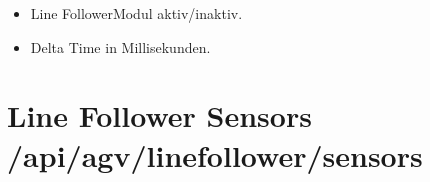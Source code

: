 \documentclass[letterpaper,10pt,english]{sphinxmanual}
\begin{document}
\sphinxAtStartPar
{}

\begin{sphinxVerbatim}[commandchars=\\\{\}]
\end{sphinxVerbatim}

\sphinxAtStartPar
{}
\begin{itemize}
\item {} 
\sphinxAtStartPar
{}  \textendash{} Line Follower\sphinxhyphen{}Modul aktiv/inaktiv.

\item {} 
\sphinxAtStartPar
{}  \textendash{} Delta Time in Millisekunden.

\end{itemize}


\section{Line Follower Sensors \textendash{} /api/agv/linefollower/sensors}
\label{\detokenize{agv_rest_api_linefollower:line-follower-sensors-api-agv-linefollower-sensors}}\label{\detokenize{agv_rest_api_linefollower:get-api-agv-line-follower-sensors}}
\end{document}
